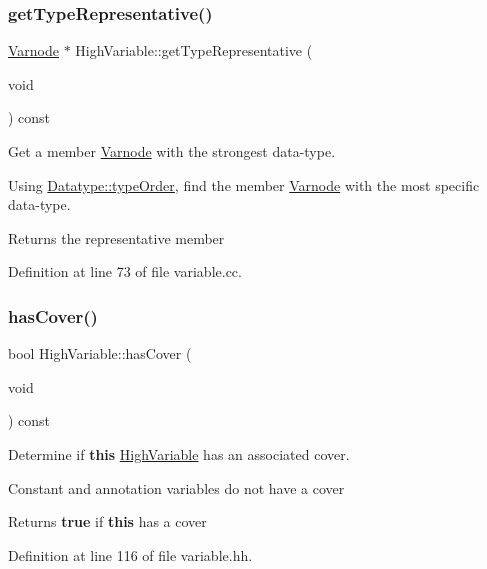 \subsubsection{\texorpdfstring{getTypeRepresentative()}{getTypeRepresentative()}}
{\footnotesize\ttfamily \mbox{\hyperlink{class_varnode}{Varnode}} $\ast$ High\+Variable\+::get\+Type\+Representative (\begin{DoxyParamCaption}\item[{void}]{ }\end{DoxyParamCaption}) const}



Get a member \mbox{\hyperlink{class_varnode}{Varnode}} with the strongest data-\/type. 

Using \mbox{\hyperlink{class_datatype_a97e8ffb05266d744b2a63d20a76a9974}{Datatype\+::type\+Order}}, find the member \mbox{\hyperlink{class_varnode}{Varnode}} with the most specific data-\/type. \begin{DoxyReturn}{Returns}
the representative member 
\end{DoxyReturn}


Definition at line 73 of file variable.\+cc.

\mbox{\label{class_high_variable_a7144f5f47bc8b53e9ea9f947e35f764a}} 
\subsubsection{\texorpdfstring{hasCover()}{hasCover()}}
{\footnotesize\ttfamily bool High\+Variable\+::has\+Cover (\begin{DoxyParamCaption}\item[{void}]{ }\end{DoxyParamCaption}) const\hspace{0.3cm}{\ttfamily [inline]}}



Determine if {\bfseries{this}} \mbox{\hyperlink{class_high_variable}{High\+Variable}} has an associated cover. 

Constant and annotation variables do not have a cover \begin{DoxyReturn}{Returns}
{\bfseries{true}} if {\bfseries{this}} has a cover 
\end{DoxyReturn}


Definition at line 116 of file variable.\+hh.

